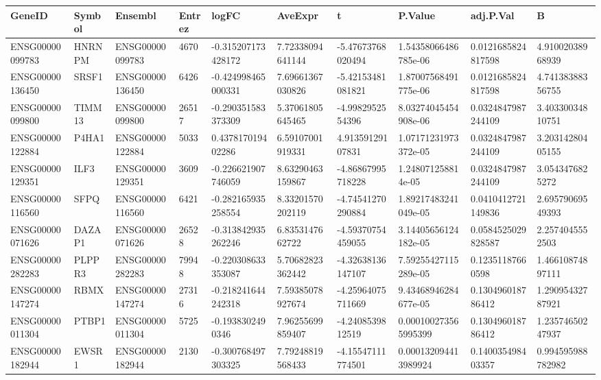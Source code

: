 \begingroup
\tiny
\setlength{\tabcolsep}{2pt}
\renewcommand{\arraystretch}{1.18}
\begin{tabular}{@{}llllllllll@{}}
\toprule
GeneID & Symbol & Ensembl & Entrez & logFC & AveExpr & t & P.Value & adj.P.Val & B \\
\midrule
ENSG00000099783 & HNRNPM & ENSG00000099783 & 4670 & -0.315207173428172 & 7.72338094641144 & -5.47673768020494 & 1.54358066486785e-06 & 0.0121685824817598 & 4.91002038968939 \\
ENSG00000136450 & SRSF1 & ENSG00000136450 & 6426 & -0.424998465000331 & 7.69661367030826 & -5.42153481081821 & 1.87007568491775e-06 & 0.0121685824817598 & 4.74138388356755 \\
ENSG00000099800 & TIMM13 & ENSG00000099800 & 26517 & -0.290351583373309 & 5.37061805645465 & -4.9982952554396 & 8.03274045454908e-06 & 0.0324847987244109 & 3.40330034810751 \\
ENSG00000122884 & P4HA1 & ENSG00000122884 & 5033 & 0.437817019402286 & 6.59107001919331 & 4.91359129107831 & 1.07171231973372e-05 & 0.0324847987244109 & 3.20314280405155 \\
ENSG00000129351 & ILF3 & ENSG00000129351 & 3609 & -0.226621907746059 & 8.63290463159867 & -4.86867995718228 & 1.248071258814e-05 & 0.0324847987244109 & 3.0543476825272 \\
ENSG00000116560 & SFPQ & ENSG00000116560 & 6421 & -0.282165935258554 & 8.33201570202119 & -4.74541270290884 & 1.89217483241049e-05 & 0.0410412721149836 & 2.69579069549393 \\
ENSG00000071626 & DAZAP1 & ENSG00000071626 & 26528 & -0.313842935262246 & 6.8353147662722 & -4.59370754459055 & 3.14405656124182e-05 & 0.0584525029828587 & 2.2574045552503 \\
ENSG00000282283 & PLPPR3 & ENSG00000282283 & 79948 & -0.220308633353087 & 5.70682823362442 & -4.32638136147107 & 7.59255427115289e-05 & 0.12351187660598 & 1.46610874897111 \\
ENSG00000147274 & RBMX & ENSG00000147274 & 27316 & -0.218241644242318 & 7.59385078927674 & -4.25964075711669 & 9.43468946284677e-05 & 0.130496018786412 & 1.29095432787921 \\
ENSG00000011304 & PTBP1 & ENSG00000011304 & 5725 & -0.1938302490346 & 7.96255699859407 & -4.2408539812519 & 0.000100273565995399 & 0.130496018786412 & 1.23574650247937 \\
ENSG00000182944 & EWSR1 & ENSG00000182944 & 2130 & -0.300768497303325 & 7.79248819568433 & -4.15547111774501 & 0.000132094413989924 & 0.140035498403357 & 0.994595988782982 \\

\end{tabular}
